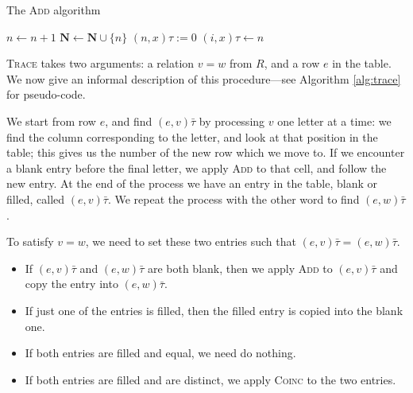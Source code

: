 \begin{algorithm}
\caption{The \textsc{Add} algorithm}
\label{alg:add}
\begin{algorithmic}[1]
\State $n \gets n + 1$
\State $\mathbf{N} \gets \mathbf{N} \cup \{n\}$
  \State $(n, x)\tau := 0$
\EndFor
\State $(i, x)\tau \gets n$
\EndProcedure
\end{algorithmic}
\end{algorithm}

\textsc{Trace} takes two arguments: a relation $v=w$ from $R$, and a row $e$
in the table.  We now give an informal description of this procedure---see
Algorithm \ref{alg:trace} for pseudo-code.

We start from row $e$, and find $(e, v)\bar\tau$ by processing $v$ one letter at a time: we
find the column corresponding to the letter, and look at that position in the
table; this gives us the number of the new row which we move to.  If we
encounter a blank entry before the final letter, we apply \textsc{Add} to that
cell, and follow the new entry.  At the end of the process we have an entry in
the table, blank or filled, called $(e, v)\bar\tau$.  We repeat the
process with the other word to find $(e, w)\bar\tau$.

To satisfy $v=w$, we need to set these two entries such that
$(e, v)\bar\tau = (e, w)\bar\tau$.
\begin{itemize}
\item If $(e, v)\bar\tau$ and $(e, w)\bar\tau$ are both blank, then we apply
  \textsc{Add} to $(e, v)\bar\tau$ and copy the entry into $(e, w)\bar\tau$.
\item If just one of the entries is filled, then the filled entry is copied into
  the blank one.
\item If both entries are filled and equal, we need do nothing.
\item If both entries are filled and are distinct, we apply \textsc{Coinc} to
  the two entries.
\end{itemize}

